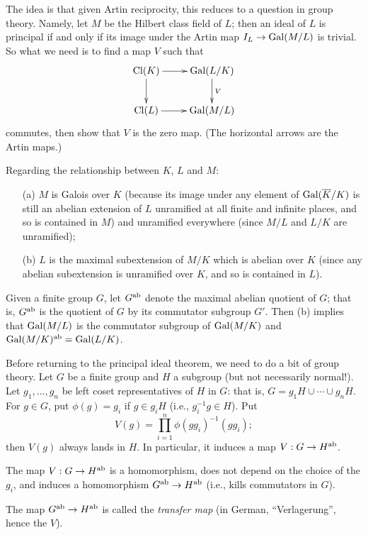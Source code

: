 The idea is that given Artin reciprocity, this reduces to a question
in group theory. Namely, let $M$ be the Hilbert class field of $L$; 
then an ideal of $L$ is principal if and only if its image under the Artin
map $I_L \to \operatorname{Gal}(M/L)$ is trivial. So what we need is to find a
map $V$ such that
\[
\xymatrix{
\Cl(K) \ar[r] \ar[d] & \Gal(L/K) \ar^{V}[d] \\
\Cl(L) \ar[r] & \Gal(M/L)
}
\]
commutes, then show that $V$ is the zero map. (The horizontal arrows are the
Artin maps.)

Regarding the relationship between $K$, $L$ and $M$:
\begin{enumerate}
\item[(a)] $M$ is Galois over $K$ (because its image under any element of
$\operatorname{Gal}(\overline{K}/K)$ is still an abelian extension of $L$ unramified
at all finite and infinite places,
and so is contained in $M$) and unramified everywhere
(since $M/L$ and $L/K$ are unramified);
\item[(b)] $L$ is the maximal subextension of $M/K$ which is abelian over $K$
(since any abelian subextension is unramified over $K$, and so is contained in $L$).
\end{enumerate}
Given a finite group $G$, let $G^{\operatorname{ab}}$ denote the maximal abelian quotient
of $G$; that is, $G^{\operatorname{ab}}$ is the quotient of $G$ by its commutator subgroup
$G'$. Then (b) implies that $\operatorname{Gal}(M/L)$ is the commutator subgroup
of $\operatorname{Gal}(M/K)$ and $\operatorname{Gal}(M/K)^{\operatorname{ab}} = \operatorname{Gal}(L/K)$.

Before returning to the principal ideal theorem, we need to do a bit of
group theory.
Let $G$ be a finite group and $H$ a subgroup (but not necessarily
normal!).
Let $g_1, \dots, g_n$ be
left
coset representatives of $H$ in $G$: that is, $G = g_1H \cup \cdots \cup g_nH$.
For $g \in G$, put $\phi(g) = g_i$ if $g \in g_iH$ (i.e.,
$g_i^{-1}g \in H$). Put
\[
V(g) = \prod_{i=1}^n \phi(gg_i)^{-1}(gg_i);
\]
then $V(g)$ always lands in $H$. In particular, it induces a map
$V: G \to H^{\operatorname{ab}}$.
\begin{theorem} \label{T:transfer homomorphism}
The map $V: G \to H^{\operatorname{ab}}$ is a homomorphism, does not depend on the choice
of the $g_i$, and induces a homomorphism $G^{\operatorname{ab}} \to H^{\operatorname{ab}}$ (i.e.,
kills commutators in $G$).
\end{theorem}
The map $G^{\operatorname{ab}} \to H^{\operatorname{ab}}$ is called the \emph{transfer map} (in German,
``Verlagerung'', hence the $V$).

